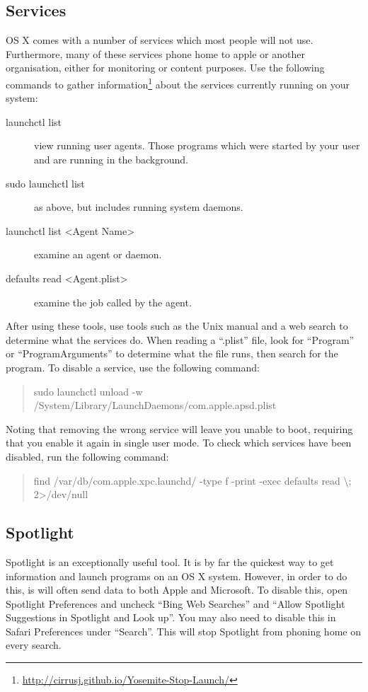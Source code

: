 \documentclass[a4paper,11pt]{report}
\begin{document}
			\subsection{Services}
				OS X comes with a number of services which most people will not use. 
				Furthermore, many of these services phone home to apple or another organisation, either for monitoring or content purposes. 
				Use the following commands to gather information\footnote{\url{http://cirrusj.github.io/Yosemite-Stop-Launch/}} about the services currently running on your system:
				\begin{description}
					\item[launchctl list]
						view running user agents. 
						Those programs which were started by your user and are running in the background. 
					\item[sudo launchctl list]
						as above, but includes running system daemons.
					\item[launchctl list <Agent Name>]
						examine an agent or daemon.
					\item[defaults read <Agent.plist>]
						examine the job called by the agent. 
				\end{description}
				After using these tools, use tools such as the Unix manual and a web search to determine what the services do. 
				When reading a ``.plist'' file, look for ``Program'' or ``ProgramArguments'' to determine what the file runs, then search for the program. 
				To disable a service, use the following command:
				\begin{quote}
					sudo launchctl unload -w /System/Library/LaunchDaemons/com.apple.apsd.plist
				\end{quote}
				Noting that removing the wrong service will leave you unable to boot, requiring that you enable it again in single user mode.
				To check which services have been disabled, run the following command:
				\begin{quote}
					find /var/db/com.apple.xpc.launchd/ -type f -print -exec defaults read {} \textbackslash; 2>/dev/null
				\end{quote}
			\subsection{Spotlight}
				Spotlight is an exceptionally useful tool. 
				It is by far the quickest way to get information and launch programs on an OS X system. 
				However, in order to do this, is will often send data to both Apple and Microsoft. 
				To disable this, open Spotlight Preferences and uncheck ``Bing Web Searches'' and ``Allow Spotlight Suggestions in Spotlight and Look up''. 
				You may also need to disable this in Safari Preferences under ``Search''. 
				This will stop Spotlight from phoning home on every search. 
\end{document}
